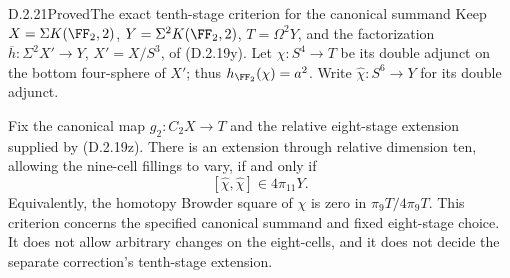 \begin{claim}{D.2.21}{Proved}{The exact tenth-stage criterion for the canonical summand}
Keep $X=\Sigma K(\FF_2,2)$, $Y=\Sigma^2K(\FF_2,2)$,
$T=\Omega^2Y$, and the factorization
$\overline h:\Sigma^2X'\to Y$, $X'=X/S^3$, of
\textup{(D.2.19y)}. Let $\chi:S^4\to T$ be its double
adjunct on the bottom four-sphere of $X'$; thus
$h_{\FF_2}(\chi)=a^2$. Write
$\widehat\chi:S^6\to Y$ for its double adjunct.

Fix the canonical map $g_2:C_2X\to T$ and the relative
eight-stage extension supplied by \textup{(D.2.19z)}.
There is an extension through relative dimension ten,
allowing the nine-cell fillings to vary, if and only if
\[
 [\widehat\chi,\widehat\chi]\in4\pi_{11}Y.
 \tag{D.2.21a}
\]
Equivalently, the homotopy Browder square of $\chi$ is zero
in $\pi_9T/4\pi_9T$. This criterion concerns the specified
canonical summand and fixed eight-stage choice. It does not
allow arbitrary changes on the eight-cells, and it does not
decide the separate correction's tenth-stage extension.
\end{claim}
